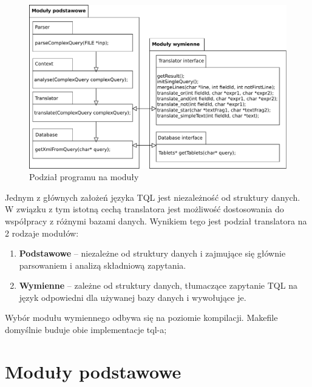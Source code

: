 \begin{figure}
 \centering
 \includegraphics[width=500px]{../diagramy/pakiety.pdf}
 \caption{Podział programu na moduły}
\end{figure}
Jednym z głównych założeń języka TQL jest niezależność od struktury danych.
W związku z tym istotną cechą translatora jest możliwość dostosowania do współpracy z różnymi bazami danych.
 Wynikiem tego jest podział translatora na 2 rodzaje modułów:
\begin{enumerate}
 \item \textbf{Podstawowe} -- niezależne od struktury danych i zajmujące się głównie parsowaniem i analizą składniową zapytania.
 \item \textbf{Wymienne} -- zależne od struktury danych, tłumaczące zapytanie TQL na język odpowiedni dla używanej bazy danych
i wywołujące je.
\end{enumerate}
 Wybór modułu wymiennego odbywa się na poziomie kompilacji. Makefile domyślnie buduje obie implementacje tql-a;


\chapter{Moduły podstawowe}

